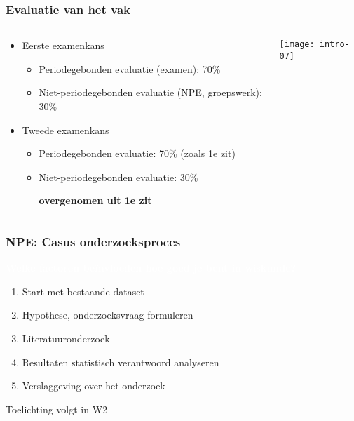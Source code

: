 \documentclass[aspectratio=169]{beamer}
\newcommand{\alertbox}[1]{%
  \begin{center}
    \colorbox{hgblue}{\textcolor{white}{\textbf{#1}}}
  \end{center}
}
\begin{document}
\begin{frame}
  \frametitle{Evaluatie van het vak}

  \begin{columns}
    \begin{column}{.8\textwidth}
      \begin{itemize}
        \item Eerste examenkans
        \begin{itemize}
          \item Periodegebonden evaluatie (examen): 70\%
          \item Niet-periodegebonden evaluatie (NPE, groepswerk): 30\%
        \end{itemize}
        \item Tweede examenkans
        \begin{itemize}
          \item Periodegebonden evaluatie: 70\% (zoals 1e zit)
          \item Niet-periodegebonden evaluatie: 30\%
          
          \textbf{overgenomen uit 1e zit}
        \end{itemize}
      \end{itemize}
    \end{column}
    \begin{column}{.2\textwidth}
      \texttt{[image: intro-07]}
    \end{column}
  \end{columns}

\end{frame}

\begin{frame}
  \frametitle{NPE: Casus onderzoeksproces}
  
  \alertbox{Welke factoren beïnvloeden hoe goed je bent in wiskunde?}
  
  \begin{enumerate}
    \item Start met bestaande dataset
    \item Hypothese, onderzoeksvraag formuleren
    \item Literatuuronderzoek
    \item Resultaten statistisch verantwoord analyseren
    \item Verslaggeving over het onderzoek
  \end{enumerate}
  
  \begin{center}
    Toelichting volgt in W2
  \end{center}
\end{frame}
\end{document}
